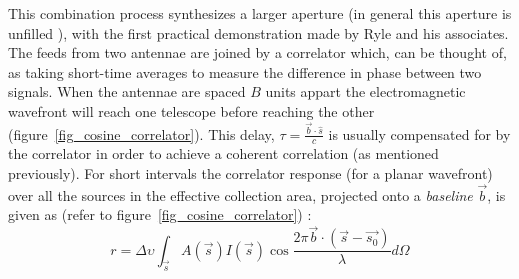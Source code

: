 \documentclass[a4paper,10pt]{report}
\begin{document}
This combination process synthesizes a larger aperture (in general this aperture is unfilled \cite{christiansenradiotelescopes}), with the first practical demonstration made by Ryle and his associates. The feeds from two antennae are joined by a 
correlator which, can be thought of, as taking short-time averages to measure the difference in phase between two signals. When the antennae are spaced $B$ units appart the electromagnetic wavefront will reach one telescope before reaching the 
other (figure~\ref{fig_cosine_correlator}). This delay, $\tau=\frac{\vec{b}\cdot\hat{s}}{c}$ is usually compensated for by the correlator in order to achieve a coherent correlation (as mentioned previously). For short intervals the correlator 
response (for a planar wavefront) over all the sources in the effective collection area, projected onto a \textit{baseline} $\vec{b}$, is given as (refer to figure~\ref{fig_cosine_correlator}) \cite{taylor1999synthesis}:
\begin{equation}
\label{eqn_cosine_correlation}
r=\Delta\upsilon \int_{\vec{s}}{A(\vec{s})I(\vec{s})\cos{\frac{2\pi\vec{b}\cdot(\vec{s}-\vec{s_0})}{\lambda}}d\Omega}
\end{equation}
\end{document}
